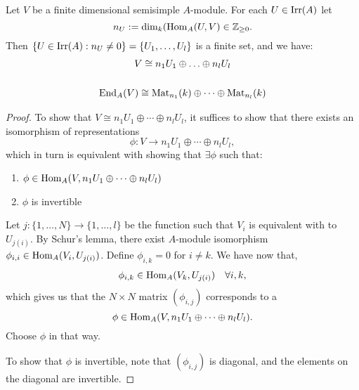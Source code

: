 \begin{prop}
Let \(V\) be a finite dimensional semisimple \(A\)-module. For each \(U\in \operatorname{Irr}(A)\) let
\[
n_U:=\dim_{k} (\operatorname{Hom}_A(U,V) \in  \Bbb{Z}_{\geq 0}.
\]
Then \(\{U\in \operatorname{Irr}(A) : n_U\neq 0\}=\{U_{1},\ldots ,U_{l}\}\) is a finite set, and we have:
\begin{gather*}
V\cong n_{1}U_{1}\oplus \ldots \oplus n_{l}U_{l} \\
\\
\operatorname{End}_A(V)\cong \operatorname{Mat}_{n_{1}}(k)\oplus \cdots \oplus \operatorname{Mat}_{n_{l}}(k)
\end{gather*}
\end{prop}

\begin{proof}
To show that \(V\cong n_{1}U_{1}\oplus \cdots \oplus n_{l}U_{l}\), it suffices to show that there exists an isomorphism of representations
\[
\phi :V\rightarrow n_{1}U_{1}\oplus \cdots \oplus n_{l}U_{l},
\]
which in turn is equivalent with showing that \(\exists \phi \) such that:

\begin{enumerate}
  \item \(\phi \in \operatorname{Hom}_A(V,n_{1}U_{1}\oplus \cdots \oplus n_{l}U_{l})\)
  \item \(\phi \) is invertible
\end{enumerate}

Let \(j:\{1,\ldots ,N\}\rightarrow \{1,\ldots ,l\}\) be the function such that \(V_{i}\) is equivalent with to \(U_{j(i)}\). By Schur's lemma, there exist \(A\)-module isomorphism \(\phi _{i,i}\in \operatorname{Hom}_A(V_{i},U_{j(i)})\). Define \(\phi _{i,k}=0\) for \(i\neq k\). We have now that,
\begin{align*}
\phi _{i,k}\in \operatorname{Hom}_A(V_{k},U_{j(i)}) &&\forall i,k,
\end{align*}
which gives us that the \(N\times N\) matrix \((\phi _{i,j})\) corresponds to a
\[
\phi \in \operatorname{Hom}_A(V,n_{1}U_{1}\oplus \cdots \oplus n_{l}U_{l}).
\]
Choose \(\phi \) in that way.

To show that \(\phi \) is invertible, note that \((\phi _{i,j})\) is diagonal, and the elements on the diagonal are invertible.
\end{proof}


